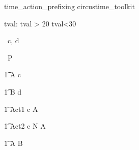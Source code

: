 \begin{zsection}
   \SECTION time\_action\_prefixing \parents circustime\_toolkit
\end{zsection}


\begin{axdef}
   tval: \nat
\where
   tval > 20 \land tval<30
\end{axdef}


\begin{circus}
   \circchannel\ c, d \\
\end{circus}

\begin{circus}
    \circprocess\ P \circdef \circbegin \\
\end{circus}

\begin{circusaction}
    	\t1 A \circdef c \then \Skip \\
\end{circusaction}

\begin{circusaction}
        \t1 B \circdef d \then \Skip \\
\end{circusaction}

\begin{circusaction}
        \t1 Act1 \circdef  c \then {} \rcirctime A  \\
\end{circusaction}


\begin{circusaction}
        \t1 Act2 \circdef c \circat N  \then A \\
\end{circusaction}





\begin{circusaction}        
        \t1 \circspot A \circseq B\\
\end{circusaction}

\begin{circus}    
\circend
\end{circus}


